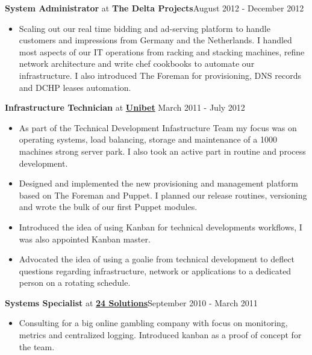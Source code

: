 \documentclass[8pt]{article}
\newenvironment{outerlist}[1][\enskip\textbullet]%
        {\begin{itemize}[#1]}{\end{itemize}%
         \vspace{-.6\baselineskip}}
\newcommand{\blankline}{\quad\pagebreak[2]}
\begin{document}
\textbf{System Administrator} at {\textbf{The Delta Projects}}\hfill {August 2012 - December 2012}
\begin{outerlist}
\item[] Scaling out our real time bidding and ad-serving platform to handle customers and impressions from Germany and the Netherlands. I handled most aspects of our IT operations from racking and stacking machines, refine network architecture and write chef cookbooks to automate our infrastructure. I also introduced The Foreman for provisioning, DNS records and DCHP leases automation. 
\end{outerlist}
\blankline

\textbf{Infrastructure Technician} at \href{http://www.unibet.com}{\textbf{Unibet}}  \hfill {March 2011 - July 2012}
\begin{outerlist}
	\item[] As part of the Technical Development Infastructure Team my focus was on operating systems, load balancing, storage and maintenance of a 1000 machines strong server park. I also took an active part in routine and process development. 
	 \item Designed and implemented the new provisioning and management platform based on The Foreman and Puppet. I planned our release routines, versioning and wrote the bulk of our first Puppet modules.
	\item Introduced the idea of using Kanban for technical developments workflows, I was also appointed Kanban master.
	\item Advocated the idea of using a goalie from technical development to deflect questions regarding infrastructure, network or applications to a dedicated person on a rotating schedule.
	
\end{outerlist}
\blankline

 \textbf{Systems Specialist} at \href{http://www.24solutions.se}{\textbf{24 Solutions}}\hfill {September 2010 - March 2011}
\begin{outerlist}
	\item[] Consulting for a big online gambling company with focus on monitoring, metrics and centralized logging. Introduced kanban as a proof of concept for the team.
\end{outerlist}
\blankline
\end{document}
